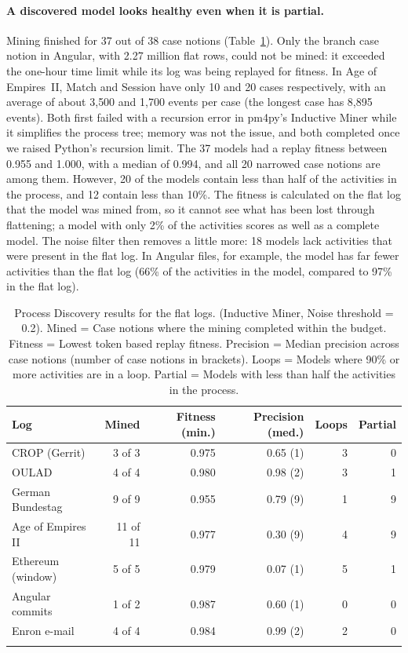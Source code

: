 \documentclass[pdflatex,sn-mathphys-num]{sn-jnl}
\begin{document}
\paragraph{A discovered model looks healthy even when it is partial.} Mining finished for 37 out of 38 case notions (Table~\ref{tab:discovery}). Only the branch case notion in Angular, with 2.27 million flat rows, could not be mined: it exceeded the one-hour time limit while its log was being replayed for fitness. In Age of Empires~II, Match and Session have only 10 and 20 cases respectively, with an average of about 3{,}500 and 1{,}700 events per case (the longest case has 8{,}895 events). Both first failed with a recursion error in pm4py's Inductive Miner while it simplifies the process tree; memory was not the issue, and both completed once we raised Python's recursion limit. The 37 models had a replay fitness between 0.955 and 1.000, with a median of 0.994, and all 20 narrowed case notions are among them. However, 20 of the models contain less than half of the activities in the process, and 12 contain less than 10\%. The fitness is calculated on the flat log that the model was mined from, so it cannot see what has been lost through flattening; a model with only 2\% of the activities scores as well as a complete model. The noise filter then removes a little more: 18 models lack activities that were present in the flat log. In Angular files, for example, the model has far fewer activities than the flat log (66\% of the activities in the model, compared to 97\% in the flat log).

\begin{table}[htbp]
\caption{Process Discovery results for the flat logs. (Inductive Miner, Noise threshold = 0.2). Mined = Case notions where the mining completed within the budget. Fitness = Lowest token based replay fitness. Precision = Median precision across case notions (number of case notions in brackets). Loops = Models where 90\% or more activities are in a loop. Partial = Models with less than half the activities in the process.}\label{tab:discovery}
\footnotesize
\setlength{\tabcolsep}{3pt}
\begin{tabular*}{\textwidth}{@{\extracolsep\fill}lrrrrr}
\toprule
Log & Mined & Fitness (min.) & Precision (med.) & Loops & Partial \\
\midrule
CROP (Gerrit) & 3 of 3 & 0.975 & 0.65 (1) & 3 & 0 \\
OULAD & 4 of 4 & 0.980 & 0.98 (2) & 3 & 1 \\
German Bundestag & 9 of 9 & 0.955 & 0.79 (9) & 1 & 9 \\
Age of Empires II & 11 of 11 & 0.977 & 0.30 (9) & 4 & 9 \\
Ethereum (window) & 5 of 5 & 0.979 & 0.07 (1) & 5 & 1 \\
Angular commits & 1 of 2 & 0.987 & 0.60 (1) & 0 & 0 \\
Enron e-mail & 4 of 4 & 0.984 & 0.99 (2) & 2 & 0 \\
\botrule
\end{tabular*}
\end{table}
\end{document}
